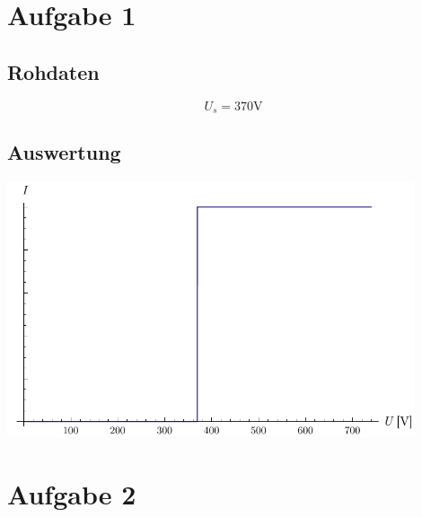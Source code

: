 \documentclass[12pt,a4paper]{article}
\begin{document}
\section*{Aufgabe 1}
\subsection*{Rohdaten}
\[ U_s = 370 \mbox{V} \]

\subsection*{Auswertung}
\begin{center}
\includegraphics[width=12cm]{diagram1.pdf}
\end{center}


\section*{Aufgabe 2}
\end{document}
